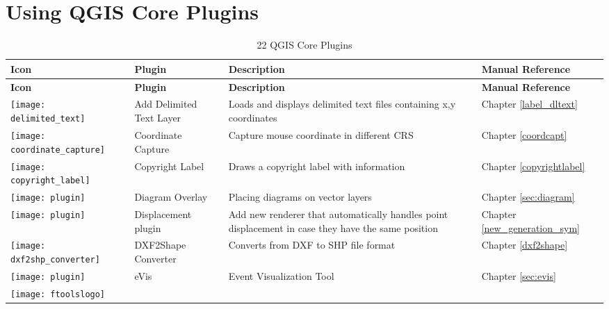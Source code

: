 
\chapter{Using QGIS Core Plugins}\label{sec:core_plugins}

\updatedisclaimer


{\setlength{\extrarowheight}{15pt}
\small
\begin{longtable}{|p{1.2cm}|p{3.8cm}|p{7.5cm}|p{3cm}|}
\caption{22 QGIS Core Plugins}\label{tab:core_plugins} \\
\hline
 \textbf{Icon} & \textbf{Plugin} & \textbf{Description} & \textbf{Manual Reference}\\
\endfirsthead
\hline
\textbf{Icon} & \textbf{Plugin} & \textbf{Description} & \textbf{Manual Reference}\\
\endhead
\hline
\texttt{[image: delimited\_text]}
 & Add Delimited Text Layer \index{plugins!delimited text} & Loads and displays delimited text files containing x,y coordinates & Chapter \ref{label_dltext}\\
\hline
\texttt{[image: coordinate\_capture]}
 & Coordinate Capture \index{plugins!coordinate capture}& Capture mouse coordinate in different CRS & Chapter \ref{coordcapt}\\
\hline 
\texttt{[image: copyright\_label]}
 & Copyright Label \index{plugins!copyright}& Draws a copyright label with information & Chapter \ref{copyrightlabel}\\
\hline
\texttt{[image: plugin]}
 & Diagram Overlay \index{plugins!diagram}& Placing diagrams on vector layers & Chapter \ref{sec:diagram}\\
\hline
\texttt{[image: plugin]}
 & Displacement plugin \index{plugins!point displacement}& Add new renderer that automatically handles point displacement in case they have the same position & Chapter \ref{new_generation_sym}\\
\hline
\texttt{[image: dxf2shp\_converter]}
 & DXF2Shape Converter \index{plugins!DXF2Shape}& Converts from DXF to SHP file format & Chapter \ref{dxf2shape}\\
\hline
\texttt{[image: plugin]}
 & eVis & Event Visualization Tool & Chapter \ref{sec:evis}\\
\hline
\texttt{[image: ftoolslogo]}

\end{longtable}}

